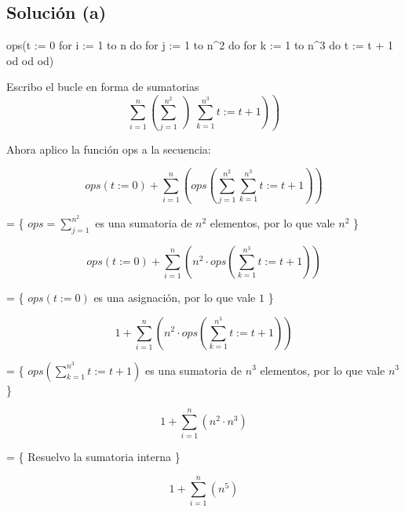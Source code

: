 \documentclass{article}
\begin{document}
\subsection{Solución (a)}

\begin{codebox}
\begin{pascallike}
ops(t := 0
for i := 1 to n do
    for j := 1 to n^2 do
    for k := 1 to n^3 do
        t := t + 1
    od
    od
od)
\end{pascallike}
\end{codebox}

Escribo el bucle en forma de sumatorias 
\begin{equation*}
  \sum_{i=1}^{n} \left(  \sum_{j=1}^{n^2} \left) \sum_{k=1}^{n^3} t := t+1 \right) \right)
\end{equation*}

Ahora aplico la función ops a la secuencia:

\begin{equation*}
  ops(t := 0) + \sum_{i=1}^{n} \left(  ops\left(\sum_{j=1}^{n^2} \sum_{k=1}^{n^3} t := t+1 \right) \right)
\end{equation*}

= \{ $ops=\sum_{j=1}^{n^2}$ es una sumatoria de $n^2$ elementos, por lo que vale $n^2$ \}

\begin{equation*}
  ops(t := 0) + \sum_{i=1}^{n} \left(  n^2 \cdot ops \left(\sum_{k=1}^{n^3} t := t+1 \right) \right)
\end{equation*}

= \{ $ops(t := 0)$ es una asignación, por lo que vale $1$ \}

\begin{equation*}
  1 + \sum_{i=1}^{n} \left(  n^2 \cdot ops \left(\sum_{k=1}^{n^3} t := t+1 \right) \right)
\end{equation*}

= \{ $ops \left(\sum_{k=1}^{n^3} t := t+1 \right)$ es una sumatoria de $n^3$ elementos, por lo que vale $n^3$ \}

\begin{equation*}
  1 + \sum_{i=1}^{n} \left(  n^2 \cdot n^3 \right)
\end{equation*}

= \{ Resuelvo la sumatoria interna \}

\begin{equation*}
  1 + \sum_{i=1}^{n} \left(  n^5 \right)
\end{equation*}
\end{document}

